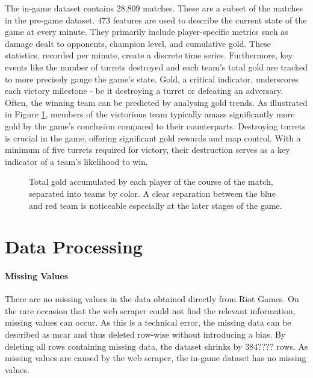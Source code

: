 \documentclass[12pt, a4paper, headinclude, twoside, plainheadsepline, open=right, numbers=noenddot, hidelinks, toc=listof, toc=bibliography]{scrreprt}
\begin{document}
The in-game dataset contains 28,809 matches.
These are a subset of the matches in the pre-game dataset.
$473$ features are used to describe the current state of the game at every minute.
They primarily include player-specific metrics such as damage dealt to opponents, champion level, and cumulative gold. 
These statistics, recorded per minute, create a discrete time series. 
Furthermore, key events like the number of turrets destroyed and each team's total gold are tracked to more precisely gauge the game's state. 
Gold, a critical indicator, underscores each victory milestone - be it destroying a turret or defeating an adversary. 
Often, the winning team can be predicted by analysing gold trends. 
As illustrated in Figure \ref{fig:totalGold}, members of the victorious team typically amass significantly more gold by the game's conclusion compared to their counterparts.
Destroying turrets is crucial in the game, offering significant gold rewards and map control. 
With a minimum of five turrets required for victory, their destruction serves as a key indicator of a team's likelihood to win.

\begin{figure}

\caption{Total gold accumulated by each player of the course of the match, separated into teams by color. 
A clear separation between the blue and red team is noticeable especially at the later stages of the game.}
\label{fig:totalGold}
\end{figure}


\section{Data Processing}
\label{sec:data_processing}

\paragraph{Missing Values}
There are no missing values in the data obtained directly from Riot Games.
On the rare occasion that the web scraper could not find the relevant information, missing values can occur.
As this is a technical error, the missing data can be described as \ac{mcar} \cite{acockWorkingMissingValues2005} and thus deleted row-wise without introducing a bias.
By deleting all rows containing missing data, the dataset shrinks by 384???? rows.
As missing values are caused by the web scraper, the in-game dataset has no missing values.
\end{document}
